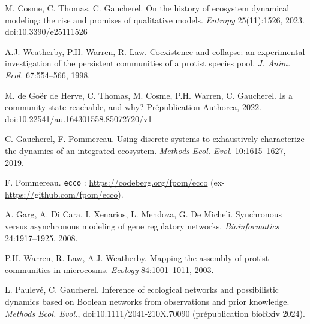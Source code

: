 \documentclass[10pt,a4paper]{article}
\newcommand{\titre}[1]{\par\vspace{0.5em}{\large\bfseries #1}\par\vspace{0.15em}}
\newcommand{\ecco}{\texttt{ecco}}
\begin{document}
\titre{Références}
{\footnotesize\NoAutoSpacing
\begin{enumerate}[label={[\arabic*]}]
\item M. Cosme, C. Thomas, C. Gaucherel. On the history of ecosystem dynamical modeling: the rise and promises of qualitative models. \emph{Entropy} 25(11):1526, 2023. doi:10.3390/e25111526
\item A.J. Weatherby, P.H. Warren, R. Law. Coexistence and collapse: an experimental investigation of the persistent communities of a protist species pool. \emph{J. Anim. Ecol.} 67:554--566, 1998.
\item M. de Goër de Herve, C. Thomas, M. Cosme, P.H. Warren, C. Gaucherel. Is a community state reachable, and why? Prépublication Authorea, 2022. doi:10.22541/au.164301558.85072720/v1
\item C. Gaucherel, F. Pommereau. Using discrete systems to exhaustively characterize the dynamics of an integrated ecosystem. \emph{Methods Ecol. Evol.} 10:1615--1627, 2019.
\item F. Pommereau. \ecco{} : \url{https://codeberg.org/fpom/ecco} (ex-\url{https://github.com/fpom/ecco}).
\item A. Garg, A. Di Cara, I. Xenarios, L. Mendoza, G. De Micheli. Synchronous versus asynchronous modeling of gene regulatory networks. \emph{Bioinformatics} 24:1917--1925, 2008.
\item P.H. Warren, R. Law, A.J. Weatherby. Mapping the assembly of protist communities in microcosms. \emph{Ecology} 84:1001--1011, 2003.
\item L. Paulevé, C. Gaucherel. Inference of ecological networks and possibilistic dynamics based on Boolean networks from observations and prior knowledge. \emph{Methods Ecol. Evol.}, doi:10.1111/2041-210X.70090 (prépublication bioRxiv 2024).
\end{enumerate}}
\end{document}
